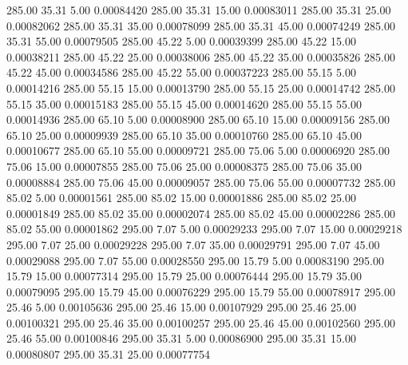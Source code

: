     285.00     35.31      5.00     0.00084420
    285.00     35.31     15.00     0.00083011
    285.00     35.31     25.00     0.00082062
    285.00     35.31     35.00     0.00078099
    285.00     35.31     45.00     0.00074249
    285.00     35.31     55.00     0.00079505
    285.00     45.22      5.00     0.00039399
    285.00     45.22     15.00     0.00038211
    285.00     45.22     25.00     0.00038006
    285.00     45.22     35.00     0.00035826
    285.00     45.22     45.00     0.00034586
    285.00     45.22     55.00     0.00037223
    285.00     55.15      5.00     0.00014216
    285.00     55.15     15.00     0.00013790
    285.00     55.15     25.00     0.00014742
    285.00     55.15     35.00     0.00015183
    285.00     55.15     45.00     0.00014620
    285.00     55.15     55.00     0.00014936
    285.00     65.10      5.00     0.00008900
    285.00     65.10     15.00     0.00009156
    285.00     65.10     25.00     0.00009939
    285.00     65.10     35.00     0.00010760
    285.00     65.10     45.00     0.00010677
    285.00     65.10     55.00     0.00009721
    285.00     75.06      5.00     0.00006920
    285.00     75.06     15.00     0.00007855
    285.00     75.06     25.00     0.00008375
    285.00     75.06     35.00     0.00008884
    285.00     75.06     45.00     0.00009057
    285.00     75.06     55.00     0.00007732
    285.00     85.02      5.00     0.00001561
    285.00     85.02     15.00     0.00001886
    285.00     85.02     25.00     0.00001849
    285.00     85.02     35.00     0.00002074
    285.00     85.02     45.00     0.00002286
    285.00     85.02     55.00     0.00001862
    295.00      7.07      5.00     0.00029233
    295.00      7.07     15.00     0.00029218
    295.00      7.07     25.00     0.00029228
    295.00      7.07     35.00     0.00029791
    295.00      7.07     45.00     0.00029088
    295.00      7.07     55.00     0.00028550
    295.00     15.79      5.00     0.00083190
    295.00     15.79     15.00     0.00077314
    295.00     15.79     25.00     0.00076444
    295.00     15.79     35.00     0.00079095
    295.00     15.79     45.00     0.00076229
    295.00     15.79     55.00     0.00078917
    295.00     25.46      5.00     0.00105636
    295.00     25.46     15.00     0.00107929
    295.00     25.46     25.00     0.00100321
    295.00     25.46     35.00     0.00100257
    295.00     25.46     45.00     0.00102560
    295.00     25.46     55.00     0.00100846
    295.00     35.31      5.00     0.00086900
    295.00     35.31     15.00     0.00080807
    295.00     35.31     25.00     0.00077754
